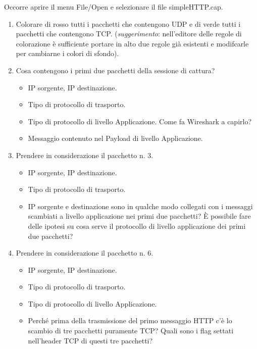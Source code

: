 \documentclass[a4paper]{article}
\begin{document}
	Occorre aprire il menu \textsf{File/Open} e selezionare il file \textsf{simpleHTTP.cap}.
	\begin{enumerate}
		\item Colorare di rosso tutti i pacchetti che contengono UDP e di verde tutti i pacchetti che contengono TCP.\newline
		(\emph{suggerimento}: nell'editore delle regole di colorazione è sufficiente portare in alto due regole già esistenti e modifcarle per cambiarne i colori di sfondo).
		
		\item Cosa contengono i primi due pacchetti della sessione di cattura?
		\begin{itemize}
			\item IP sorgente, IP destinazione.
			\item Tipo di protocollo di trasporto.
			\item Tipo di protocollo di livello Applicazione. Come fa Wireshark a capirlo?
			\item Messaggio contenuto nel Payload di livello Applicazione.
		\end{itemize}
		
		\item Prendere in considerazione il pacchetto n. 3.
		\begin{itemize}
			\item IP sorgente, IP destinazione.
			\item Tipo di protocollo di trasporto.
			\item IP sorgente e destinazione sono in qualche modo collegati con i messaggi scambiati a livello applicazione nei primi due pacchetti? È possibile fare delle ipotesi su cosa serve il protocollo di livello applicazione dei primi due pacchetti?
		\end{itemize}
		
		\item Prendere in considerazione il pacchetto n. 6.
		\begin{itemize}
			\item IP sorgente, IP destinazione.
			\item Tipo di protocollo di trasporto.
			\item Tipo di protocollo di livello Applicazione.
			\item Perché prima della trasmissione del primo messaggio HTTP c'è lo scambio di tre pacchetti puramente TCP? Quali sono i flag settati nell'header TCP di questi tre pacchetti?
		\end{itemize}
		

\end{enumerate}
\end{document}
